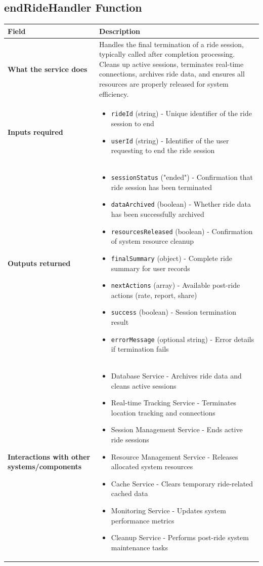 \documentclass[11pt,a4paper]{article}
\begin{document}
\subsection{endRideHandler Function}

\begin{longtable}{|p{3cm}|p{12cm}|}
\hline
\textbf{Field} & \textbf{Description} \\
\hline
\textbf{What the service does} & 
Handles the final termination of a ride session, typically called after completion processing. Cleans up active sessions, terminates real-time connections, archives ride data, and ensures all resources are properly released for system efficiency. \\
\hline
\textbf{Inputs required} & 
\begin{itemize}[nosep]
\item \texttt{rideId} (string) - Unique identifier of the ride session to end
\item \texttt{userId} (string) - Identifier of the user requesting to end the ride session
\end{itemize} \\
\hline
\textbf{Outputs returned} & 
\begin{itemize}[nosep]
\item \texttt{sessionStatus} ("ended") - Confirmation that ride session has been terminated
\item \texttt{dataArchived} (boolean) - Whether ride data has been successfully archived
\item \texttt{resourcesReleased} (boolean) - Confirmation of system resource cleanup
\item \texttt{finalSummary} (object) - Complete ride summary for user records
\item \texttt{nextActions} (array) - Available post-ride actions (rate, report, share)
\item \texttt{success} (boolean) - Session termination result
\item \texttt{errorMessage} (optional string) - Error details if termination fails
\end{itemize} \\
\hline
\textbf{Interactions with other systems/components} & 
\begin{itemize}[nosep]
\item Database Service - Archives ride data and cleans active sessions
\item Real-time Tracking Service - Terminates location tracking and connections
\item Session Management Service - Ends active ride sessions
\item Resource Management Service - Releases allocated system resources
\item Cache Service - Clears temporary ride-related cached data
\item Monitoring Service - Updates system performance metrics
\item Cleanup Service - Performs post-ride system maintenance tasks
\end{itemize} \\
\hline
\end{longtable}
\end{document}
